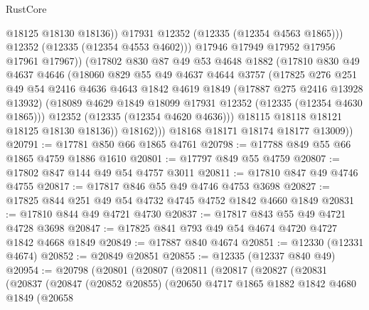 \begin{lexlean}{RustCore}
\begin{coremodule}
                        @18125
                        @18130
                        @18136))
                    @17931
                    @12352
                    (@12335 (@12354 @4563 @1865)))
                  @12352
                  (@12335 (@12354 @4553 @4602)))
                @17946
                @17949
                @17952
                @17956
                @17961
                @17967))
            (@17802
              @830
              @87
              @49
              @53
              @4648
              @1882
              (@17810
                @830
                @49
                @4637
                @4646
                (@18060
                  @829
                  @55
                  @49
                  @4637
                  @4644
                  @3757
                  (@17825
                    @276
                    @251
                    @49
                    @54
                    @2416
                    @4636
                    @4643
                    @1842
                    @4619
                    @1849
                    (@17887 @275 @2416 @13928 @13932)
                    (@18089 @4629 @1849 @18099 @17931 @12352 (@12335 (@12354 @4630 @1865)))
                    @12352
                    (@12335 (@12354 @4620 @4636)))
                  @18115
                  @18118
                  @18121
                  @18125
                  @18130
                  @18136))
              @18162)))
        @18168
        @18171
        @18174
        @18177
        @13009))
@20791 := @17781 @850 @66 @1865 @4761
@20798 := @17788 @849 @55 @66 @1865 @4759 @1886 @1610
@20801 := @17797 @849 @55 @4759
@20807 := @17802 @847 @144 @49 @54 @4757 @3011
@20811 := @17810 @847 @49 @4746 @4755
@20817 := @17817 @846 @55 @49 @4746 @4753 @3698
@20827 := @17825 @844 @251 @49 @54 @4732 @4745 @4752 @1842 @4660 @1849
@20831 := @17810 @844 @49 @4721 @4730
@20837 := @17817 @843 @55 @49 @4721 @4728 @3698
@20847 := @17825 @841 @793 @49 @54 @4674 @4720 @4727 @1842 @4668 @1849
@20849 := @17887 @840 @4674
@20851 := @12330 (@12331 @4674)
@20852 := @20849 @20851
@20855 := @12335 (@12337 @840 @49)
@20954 := @20798
    (@20801
      (@20807
        (@20811
          (@20817
            (@20827
              (@20831
                (@20837
                  (@20847
                    (@20852 @20855)
                    (@20650
                      @4717
                      @1865
                      @1882
                      @1842
                      @4680
                      @1849
                      (@20658

\end{coremodule}
\end{lexlean}
